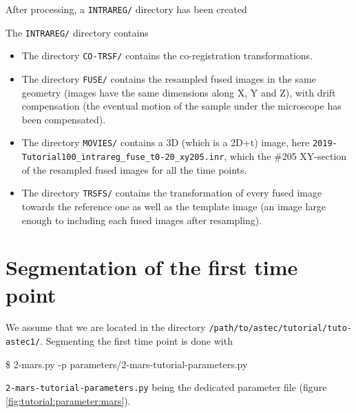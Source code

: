 After processing, a \texttt{INTRAREG/} directory has been created

\mbox{}
\mbox{}

The \texttt{INTRAREG/} directory contains

\mbox{}
\mbox{}

\begin{itemize}
\itemsep -1ex
\item The directory \texttt{CO-TRSF/} contains the co-registration
  transformations.
\item The directory \texttt{FUSE/} contains the resampled fused images
  in the same geometry (images have the same dimensions along X, Y and
  Z), with drift compensation (the eventual motion of the sample under the
  microscope has been compensated). 
\item The directory \texttt{MOVIES/} contains a 3D (which is a 2D+t)
  image, here
  \texttt{2019-Tutorial100\_intrareg\_fuse\_t0-20\_xy205.inr}, which
  the \#205 XY-section of the resampled fused images for all the time
  points.
\item The directory \texttt{TRSFS/}  contains the transformation of
  every fused image towards the reference one as well as the template
  image (an image large enough to including each fused images after
  resampling).
\end{itemize}





\section{Segmentation of the first time point}


We assume that we are located in the directory
\texttt{/path/to/astec/tutorial/tuto-astec1/}. Segmenting the first
time point is
done with
\begin{code}{0.8}
  \$ 2-mars.py -p parameters/2-mars-tutorial-parameters.py 
\end{code}
\texttt{2-mars-tutorial-parameters.py} being the
dedicated parameter file  (figure \ref{fig:tutorial:parameter:mars}).

